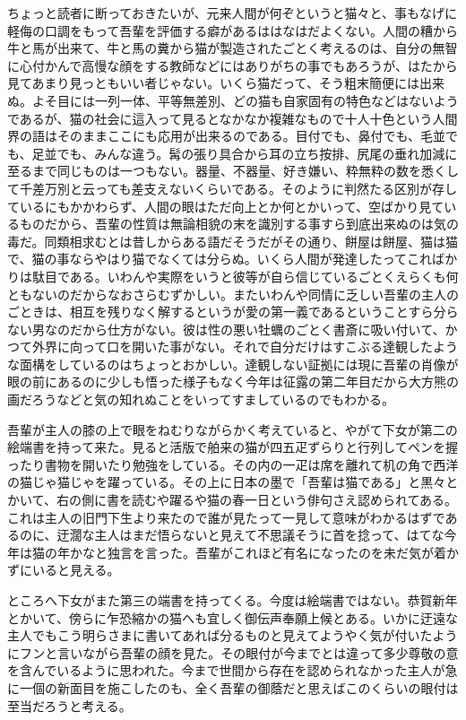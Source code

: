 \documentclass[12pt, openright]{book}
\begin{document}
ちょっと読者に断っておきたいが、元来人間が何ぞというと猫々と、事もなげに軽侮の口調をもって吾輩を評価する癖があるははなはだよくない。人間の糟から牛と馬が出来て、牛と馬の糞から猫が製造されたごとく考えるのは、自分の無智に心付かんで高慢な顔をする教師などにはありがちの事でもあろうが、はたから見てあまり見っともいい者じゃない。いくら猫だって、そう粗末簡便には出来ぬ。よそ目には一列一体、平等無差別、どの猫も自家固有の特色などはないようであるが、猫の社会に這入って見るとなかなか複雑なもので十人十色という人間界の語はそのままここにも応用が出来るのである。目付でも、鼻付でも、毛並でも、足並でも、みんな違う。髯の張り具合から耳の立ち按排、尻尾の垂れ加減に至るまで同じものは一つもない。器量、不器量、好き嫌い、粋無粋の数を悉くして千差万別と云っても差支えないくらいである。そのように判然たる区別が存しているにもかかわらず、人間の眼はただ向上とか何とかいって、空ばかり見ているものだから、吾輩の性質は無論相貌の末を識別する事すら到底出来ぬのは気の毒だ。同類相求むとは昔しからある語だそうだがその通り、餅屋は餅屋、猫は猫で、猫の事ならやはり猫でなくては分らぬ。いくら人間が発達したってこればかりは駄目である。いわんや実際をいうと彼等が自ら信じているごとくえらくも何ともないのだからなおさらむずかしい。またいわんや同情に乏しい吾輩の主人のごときは、相互を残りなく解するというが愛の第一義であるということすら分らない男なのだから仕方がない。彼は性の悪い牡蠣のごとく書斎に吸い付いて、かつて外界に向って口を開いた事がない。それで自分だけはすこぶる達観したような面構をしているのはちょっとおかしい。達観しない証拠には現に吾輩の肖像が眼の前にあるのに少しも悟った様子もなく今年は征露の第二年目だから大方熊の画だろうなどと気の知れぬことをいってすましているのでもわかる。

吾輩が主人の膝の上で眼をねむりながらかく考えていると、やがて下女が第二の絵端書を持って来た。見ると活版で舶来の猫が四五疋ずらりと行列してペンを握ったり書物を開いたり勉強をしている。その内の一疋は席を離れて机の角で西洋の猫じゃ猫じゃを躍っている。その上に日本の墨で「吾輩は猫である」と黒々とかいて、右の側に書を読むや躍るや猫の春一日という俳句さえ認められてある。これは主人の旧門下生より来たので誰が見たって一見して意味がわかるはずであるのに、迂濶な主人はまだ悟らないと見えて不思議そうに首を捻って、はてな今年は猫の年かなと独言を言った。吾輩がこれほど有名になったのを未だ気が着かずにいると見える。

ところへ下女がまた第三の端書を持ってくる。今度は絵端書ではない。恭賀新年とかいて、傍らに乍恐縮かの猫へも宜しく御伝声奉願上候とある。いかに迂遠な主人でもこう明らさまに書いてあれば分るものと見えてようやく気が付いたようにフンと言いながら吾輩の顔を見た。その眼付が今までとは違って多少尊敬の意を含んでいるように思われた。今まで世間から存在を認められなかった主人が急に一個の新面目を施こしたのも、全く吾輩の御蔭だと思えばこのくらいの眼付は至当だろうと考える。
\end{document}

